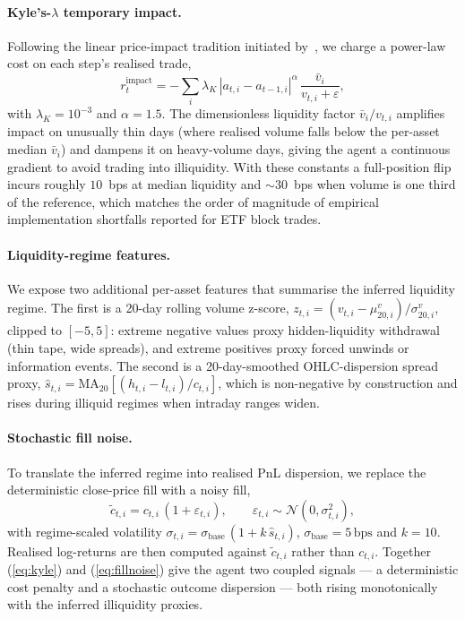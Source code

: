 \documentclass[conference]{IEEEtran}
\begin{document}
\paragraph{Kyle's-$\lambda$ temporary impact.} Following the linear
price-impact tradition initiated by~\cite{kyle1985impact}, we charge a
power-law cost on each step's realised trade,
\begin{equation}
  r^{\text{impact}}_t = -\sum_i \lambda_K
       \,|a_{t,i}-a_{t-1,i}|^{\alpha}
       \,\frac{\bar{v}_i}{v_{t,i}+\varepsilon},
  \label{eq:kyle}
\end{equation}
with $\lambda_K = 10^{-3}$ and $\alpha = 1.5$. The dimensionless
liquidity factor $\bar{v}_i / v_{t,i}$ amplifies impact on
unusually thin days (where realised volume falls below the per-asset
median $\bar{v}_i$) and dampens it on heavy-volume days, giving the
agent a continuous gradient to avoid trading into illiquidity. With
these constants a full-position flip incurs roughly $10$~bps at median
liquidity and $\sim 30$~bps when volume is one third of the reference,
which matches the order of magnitude of empirical implementation
shortfalls reported for ETF block trades.

\paragraph{Liquidity-regime features.} We expose two additional per-asset
features that summarise the inferred liquidity regime. The first is a
20-day rolling volume z-score, $z_{t,i} = (v_{t,i}-\mu^v_{20,i})/
\sigma^v_{20,i}$, clipped to $[-5, 5]$: extreme negative values proxy
hidden-liquidity withdrawal (thin tape, wide spreads), and extreme
positives proxy forced unwinds or information events. The second is a
20-day-smoothed OHLC-dispersion spread proxy,
$\hat{s}_{t,i} = \mathrm{MA}_{20}\!\left[(h_{t,i}-l_{t,i})/c_{t,i}\right]$,
which is non-negative by construction and rises during illiquid regimes
when intraday ranges widen.

\paragraph{Stochastic fill noise.} To translate the inferred regime into
realised PnL dispersion, we replace the deterministic close-price fill
with a noisy fill,
\begin{equation}
  \tilde{c}_{t,i} = c_{t,i}\,(1 + \varepsilon_{t,i}), \qquad
  \varepsilon_{t,i} \sim \mathcal{N}(0, \sigma_{t,i}^{2}),
  \label{eq:fillnoise}
\end{equation}
with regime-scaled volatility
$\sigma_{t,i} = \sigma_{\text{base}}\,(1 + k\,\hat{s}_{t,i})$,
$\sigma_{\text{base}} = 5\,\text{bps}$ and $k = 10$. Realised
log-returns are then computed against $\tilde{c}_{t,i}$ rather than
$c_{t,i}$. Together (\ref{eq:kyle}) and (\ref{eq:fillnoise}) give the
agent two coupled signals --- a deterministic cost penalty and a
stochastic outcome dispersion --- both rising monotonically with the
inferred illiquidity proxies.
\end{document}
